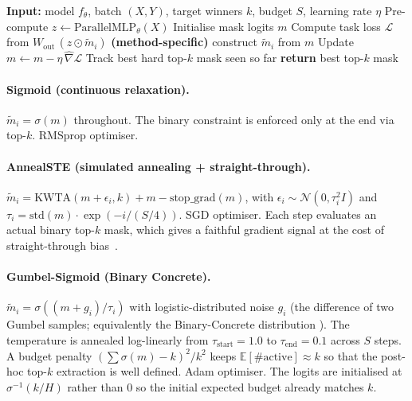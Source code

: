 \documentclass{article}
\theoremstyle{plain}
\theoremstyle{remark}
\begin{document}
\begin{algorithm}[t]
\caption{Mask configurer (generic scaffold)}
\label{alg:configurer}
\begin{algorithmic}[1]
\STATE \textbf{Input:} model $f_\theta$, batch $(X,Y)$, target winners $k$,
       budget $S$, learning rate $\eta$
\STATE Pre-compute $z\leftarrow\mathrm{ParallelMLP}_\theta(X)$
\STATE Initialise mask logits $m$ 
\STATE Compute task loss $\mathcal{L}$ from $W_\mathrm{out}\,(z\odot \tilde m_i)$
\STATE \textbf{(method-specific)} construct $\tilde m_i$ from $m$
\STATE Update $m\leftarrow m-\eta\,\widehat\nabla\mathcal{L}$
\STATE Track best hard top-$k$ mask seen so far
\ENDFOR
\STATE \textbf{return} best top-$k$ mask
\end{algorithmic}
\end{algorithm}

\paragraph{Sigmoid (continuous relaxation).}
$\tilde m_i=\sigma(m)$ throughout. The binary constraint is enforced
only at the end via top-$k$. RMSprop optimiser.

\paragraph{AnnealSTE (simulated annealing + straight-through).}
$\tilde m_i = \mathrm{KWTA}(m+\epsilon_i,k) + m - \mathrm{stop\_grad}(m)$, with
$\epsilon_i\sim\mathcal{N}(0,\tau_i^2I)$ and $\tau_i = \mathrm{std}(m)\cdot
\exp(-i/(S/4))$.  SGD optimiser.  Each step evaluates an actual binary
top-$k$ mask, which gives a faithful gradient signal at the cost of
straight-through bias~\citep{bengio2013estimating}.

\paragraph{Gumbel-Sigmoid (Binary Concrete).}
$\tilde m_i = \sigma((m+g_i)/\tau_i)$ with logistic-distributed noise
$g_i$ (the difference of two Gumbel samples; equivalently the
Binary-Concrete distribution \citep{maddison2017concrete}). The
temperature is annealed log-linearly from $\tau_\mathrm{start}=1.0$ to
$\tau_\mathrm{end}=0.1$ across $S$ steps. A budget penalty
$(\sum\sigma(m)-k)^2/k^2$ keeps $\mathbb{E}[\#\mathrm{active}]\approx k$
so that the post-hoc top-$k$ extraction is well defined. Adam optimiser.
The logits are initialised at $\sigma^{-1}(k/H)$ rather than $0$ so the
initial expected budget already matches $k$.
\end{document}
